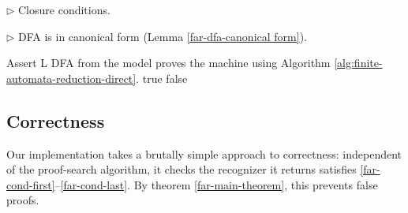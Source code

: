 \begin{algorithm}
\begin{algorithmic}[1]
      \State \(\triangleright\) Closure conditions.
        \State{}
      \EndFor
        \State{}
      \EndFor
        \State{}
      \EndFor

      \State \(\triangleright\) DFA is in canonical form (Lemma \ref{far-dfa-canonical form}).
          \State{}
          \State{}
          \State{}
        \EndFor
      \EndFor

        \State Assert L DFA from the model proves the machine using Algorithm \ref{alg:finite-automata-reduction-direct}.
        \State \Return true
      \Else\;\Return false
      \EndIf
    \EndProcedure
  \end{algorithmic}
\end{algorithm}


\subsection{Correctness}
Our implementation takes a brutally simple approach to correctness:
independent of the proof-search algorithm, it checks the recognizer it returns satisfies \eqref{far-cond-first}--\eqref{far-cond-last}.
By theorem \ref{far-main-theorem}, this prevents false proofs.


